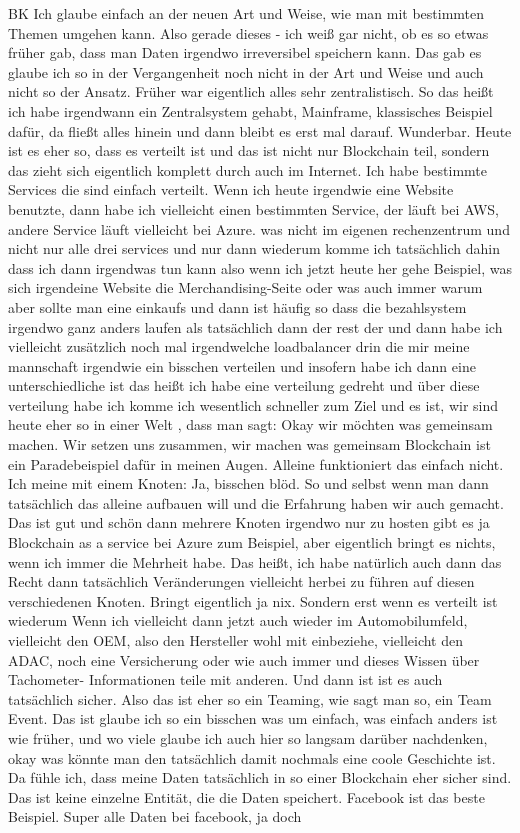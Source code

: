 \begin{xlist}
    \item[BK] Ich glaube einfach an der neuen Art und Weise, wie man mit bestimmten Themen umgehen kann. Also gerade dieses - ich weiß gar nicht, ob es so etwas früher gab, dass man Daten irgendwo irreversibel speichern kann. Das gab es glaube ich so in der Vergangenheit noch nicht in der Art und Weise und auch nicht so der Ansatz. Früher war eigentlich alles sehr zentralistisch. So das heißt ich habe irgendwann ein Zentralsystem gehabt, Mainframe, klassisches Beispiel dafür, da fließt alles hinein und dann bleibt es erst mal darauf. Wunderbar. Heute ist es eher so, dass es verteilt ist und das ist nicht nur Blockchain teil, sondern das zieht sich eigentlich komplett durch auch im Internet. Ich habe bestimmte Services die sind einfach verteilt. Wenn ich heute irgendwie eine Website benutzte, dann habe ich vielleicht einen bestimmten Service, der läuft bei AWS, andere Service läuft vielleicht bei Azure. was nicht im eigenen rechenzentrum und nicht nur alle drei services und nur dann wiederum komme ich tatsächlich dahin dass ich dann irgendwas tun kann also wenn ich jetzt heute her gehe Beispiel, was sich irgendeine Website die Merchandising-Seite oder was auch immer warum aber sollte man eine einkaufs und dann ist häufig so dass die bezahlsystem irgendwo ganz anders laufen als tatsächlich dann der rest der und dann habe ich vielleicht zusätzlich noch mal irgendwelche loadbalancer drin die mir meine mannschaft irgendwie ein bisschen verteilen und insofern habe ich dann eine unterschiedliche ist das heißt ich habe eine verteilung gedreht und über diese verteilung habe ich komme ich wesentlich schneller zum Ziel und es ist, wir sind heute eher so in einer Welt , dass man sagt: Okay wir möchten was gemeinsam machen. Wir setzen uns zusammen, wir machen was gemeinsam Blockchain ist ein Paradebeispiel dafür in meinen Augen. Alleine funktioniert das einfach nicht. Ich meine mit einem Knoten: Ja, bisschen blöd. So und selbst wenn man dann tatsächlich das alleine aufbauen will und die Erfahrung haben wir auch gemacht. Das ist gut und schön dann mehrere Knoten irgendwo nur zu hosten gibt es ja Blockchain as a service bei Azure zum Beispiel, aber eigentlich bringt es nichts, wenn ich immer die Mehrheit habe. Das heißt, ich habe natürlich auch dann das Recht dann tatsächlich Veränderungen vielleicht herbei zu führen auf diesen verschiedenen Knoten. Bringt eigentlich ja nix. Sondern erst wenn es verteilt ist wiederum Wenn ich vielleicht dann jetzt auch wieder im Automobilumfeld, vielleicht den OEM, also den Hersteller wohl mit einbeziehe, vielleicht den ADAC, noch eine Versicherung oder wie auch immer und dieses Wissen über Tachometer- Informationen teile mit anderen. Und dann ist ist es auch tatsächlich sicher. Also das ist eher so ein Teaming, wie sagt man so, ein Team Event. Das ist glaube ich so ein bisschen was um einfach, was einfach anders ist wie früher, und wo viele glaube ich auch hier so langsam darüber nachdenken, okay was könnte man den tatsächlich damit nochmals eine coole Geschichte ist. Da fühle ich, dass meine Daten tatsächlich in so einer Blockchain eher sicher sind. Das ist keine einzelne Entität, die die Daten speichert. Facebook ist das beste Beispiel. Super alle Daten bei facebook, ja doch 
\end{xlist}
